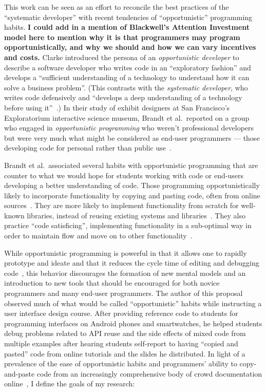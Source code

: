 \documentclass[12pt]{memoir}
\begin{document}
This work can be seen as an effort to reconcile the best practices of the ``systematic developer'' with recent tendencies of ``opportunistic'' programming habits.
\textbf{I could add in a mention of Blackwell's Attention Investment model here to mention why it is that programmers may program opportunistically, and why we should and how we can vary incentives and costs.}
Clarke introduced the persona of an \emph{opportunistic developer} to describe a software developer who writes code in an ``exploratory fashion'' and develops a ``sufficient understanding of a technology to understand how it can solve a business problem''.
(This contrasts with the \emph{systematic developer}, who writes code defensively and ``develops a deep understanding of a technology before using it''~\cite{clarke_what_2007}.)
In their study of exhibit designers at San Francisco's Exploratorium interactive science museum, Brandt et al.\ reported on a group who engaged in \emph{opportunistic programming} who weren't professional developers~\cite{brandt_opportunistic_2008} but were very much what might be considered as end-user programmers --- those developing code for personal rather than public use~\cite{ko_state_2011}.

Brandt et al.\ associated several habits with opportunistic programming that are counter to what we would hope for students working with code or end-users developing a better understanding of code.
Those programming opportunistically likely to incorporate functionality by copying and pasting code, often from online sources~\cite{brandt_two_2009}.
They are more likely to implement functionality from scratch for well-known libraries, instead of reusing existing systems and libraries~\cite{brandt_opportunistic_2008}.
They also practice ``code satisficing'', implementing functionality in a sub-optimal way in order to maintain flow and move on to other functionality~\cite{brandt_opportunistic_2008}.

While opportunistic programming is powerful in that it allows one to rapidly prototype and ideate and that it reduces the cycle time of editing and debugging code~\cite{brandt_opportunistic_2008}, this behavior discourages the formation of new mental models and an introduction to new tools that should be encouraged for both novice programmers and many end-user programmers.
The author of this proposal observed much of what would be called ``opportunistic'' habits while instructing a user interface design course.
After providing reference code to students for programming interfaces on Android phones and smartwatches, he helped students debug problems related to API reuse and the side effects of mixed code from multiple examples after hearing students self-report to having ``copied and pasted'' code from online tutorials and the slides he distributed.
In light of a prevalence of the ease of opportunistic habits and programmers' ability to copy-and-paste code from an increasingly comprehensive body of crowd documentation online~\cite{parnin_crowd_2012}, I define the goals of my research:
\end{document}
